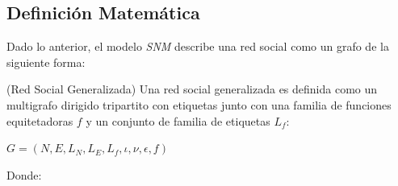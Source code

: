 
\subsection{Definición Matemática} %
\label{sub:definicion_matematica}

Dado lo anterior, el modelo \emph{SNM} describe una red social como un grafo de la siguiente forma:

\begin{defn}
  (Red Social Generalizada) Una red social generalizada es definida como un multigrafo dirigido tripartito con etiquetas junto con una familia de funciones equitetadoras $f$ y un conjunto de familia de etiquetas $L_f$:
  
  \begin{center}
    $ G = (N, E, L_N, L_E, L_f, \iota, \nu, \epsilon, f) $
  \end{center}
  
  Donde:
  

\end{defn}
